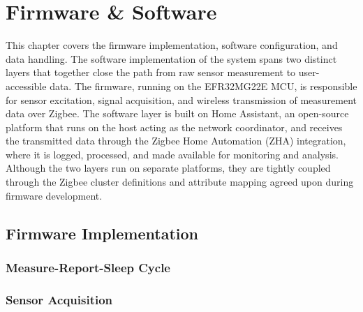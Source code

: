 \chapter{Firmware \& Software} \label{sec:Firmware_and_software}

This chapter covers the firmware implementation, software configuration, and data handling.
The software implementation of the system spans two distinct layers that together close the path from raw sensor measurement to user-accessible data.
The firmware, running on the EFR32MG22E MCU, is responsible for sensor excitation, signal acquisition, and wireless transmission of measurement data over Zigbee. 
The software layer is built on Home Assistant, an open-source platform that runs on the host acting as the network coordinator, and receives the transmitted data through the Zigbee Home Automation (ZHA) integration, where it is logged, processed, and made available for monitoring and analysis.
Although the two layers run on separate platforms, they are tightly coupled through the Zigbee cluster definitions and attribute mapping agreed upon during firmware development.



\section{Firmware Implementation} \label{sec:Firmware_Implementation }


\subsection{Measure-Report-Sleep Cycle} \label{sec:Measure-Report-Sleep_Cycle}


\subsection{Sensor Acquisition} \label{sec:Sensor_Acquisition}


